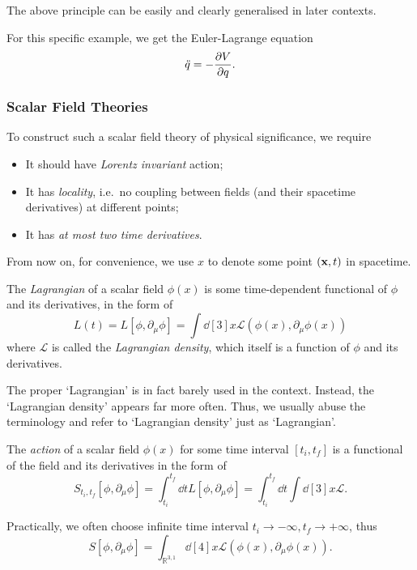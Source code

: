 \documentclass[a4paper,11pt]{article}
\begin{document}
	The above principle can be easily and clearly generalised in later contexts.

	For this specific example, we get the Euler-Lagrange equation
	\begin{equation}
		\ddot{q} = - \pdv{V}{q}.
	\end{equation}
	
	\subsubsection{Scalar Field Theories}
	
	To construct such a scalar field theory of physical significance, we require
	\begin{itemize}
		\item It should have \emph{Lorentz invariant} action;
		\item It has \emph{locality}, i.e.\ no coupling between fields (and their spacetime derivatives) at different points;
		\item It has \emph{at most two time derivatives}.
	\end{itemize}

	From now on, for convenience, we use $x$ to denote some point $(\vb x,t)$ in spacetime.

	\begin{defi}
		The \emph{Lagrangian} of a scalar field $\phi(x)$ is some time-dependent functional of $\phi$ and its derivatives, in the form of
		\begin{equation}
			L(t) = L [\phi, \partial_\mu \phi] = \int \dd[3]{x} \mathcal{L}(\phi(x),\partial_\mu \phi(x))
		\end{equation}
		where $\mathcal{L}$ is called the \emph{Lagrangian density}, which itself is a function of $\phi$ and its derivatives.
	\end{defi}

	\begin{nt}
		The proper `Lagrangian' is in fact barely used in the context. Instead, the `Lagrangian density' appears far more often. Thus, we usually abuse the terminology and refer to `Lagrangian density' just as `Lagrangian'.
	\end{nt}

	\begin{defi}
		The \emph{action} of a scalar field $\phi(x)$ for some time interval $[t_i,t_f]$ is a functional of the field and its derivatives in the form of
		\begin{equation}
			S_{t_i,t_f}[\phi, \partial_\mu \phi] = \int_{t_i}^{t_f} \dd{t} L[\phi, \partial_\mu \phi] = \int_{t_i}^{t_f} \dd{t} \int \dd[3]{x} \mathcal{L}.
		\end{equation}

		Practically, we often choose infinite time interval $t_i \to - \infty, t_f \to +\infty$, thus
		\begin{equation}
			S[\phi, \partial_\mu \phi] = \int_{\mathbb{R}^{3,1}} \dd[4]{x} \mathcal{L}(\phi(x),\partial_\mu \phi(x)).
		\end{equation}
	\end{defi}
\end{document}
